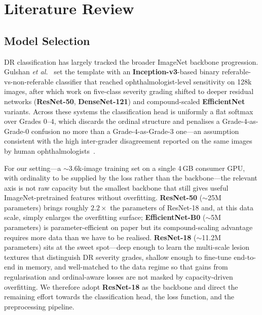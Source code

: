 \section{Literature Review}

\subsection{Model Selection}
DR classification has largely tracked the broader ImageNet backbone progression. Gulshan \textit{et al.}~\cite{gulshan2016} set the template with an \textbf{Inception-v3}-based binary referable-vs-non-referable classifier that reached ophthalmologist-level sensitivity on 128k images, after which work on five-class severity grading shifted to deeper residual networks (\textbf{ResNet-50}, \textbf{DenseNet-121}) and compound-scaled \textbf{EfficientNet} variants. Across these systems the classification head is uniformly a flat softmax over Grades $0$--$4$, which discards the ordinal structure and penalises a Grade-$4$-as-Grade-$0$ confusion no more than a Grade-$4$-as-Grade-$3$ one---an assumption consistent with the high inter-grader disagreement reported on the same images by human ophthalmologists~\cite{krause2018}.

For our setting---a $\sim$3.6k-image training set on a single 4\,GB consumer GPU, with ordinality to be supplied by the loss rather than the backbone---the relevant axis is not raw capacity but the smallest backbone that still gives useful ImageNet-pretrained features without overfitting. \textbf{ResNet-50} ($\sim$25M parameters) brings roughly $2.2\times$ the parameters of ResNet-18 and, at this data scale, simply enlarges the overfitting surface; \textbf{EfficientNet-B0} ($\sim$5M parameters) is parameter-efficient on paper but its compound-scaling advantage requires more data than we have to be realised. \textbf{ResNet-18} ($\sim$11.2M parameters) sits at the sweet spot---deep enough to learn the multi-scale lesion textures that distinguish DR severity grades, shallow enough to fine-tune end-to-end in memory, and well-matched to the data regime so that gains from regularisation and ordinal-aware losses are not masked by capacity-driven overfitting. We therefore adopt \textbf{ResNet-18} as the backbone and direct the remaining effort towards the classification head, the loss function, and the preprocessing pipeline.


